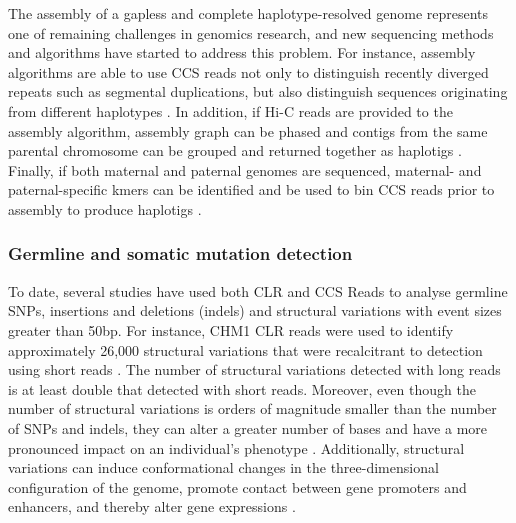 The assembly of a gapless and complete haplotype-resolved genome represents one of remaining challenges in genomics research, and new sequencing methods and algorithms have started to address this problem. For instance, assembly algorithms are able to use CCS reads not only to distinguish recently diverged repeats such as segmental duplications, but also distinguish sequences originating from different haplotypes \cite{}. In addition, if Hi-C reads are provided to the assembly algorithm, assembly graph can be phased and contigs from the same parental chromosome can be grouped and returned together as haplotigs \cite{}. Finally, if both maternal and paternal genomes are sequenced, maternal- and paternal-specific kmers can be identified and be used to bin CCS reads prior to assembly to produce haplotigs \cite{}. 

\subsubsection{Germline and somatic mutation detection}

To date, several studies have used both CLR and CCS Reads to analyse germline SNPs, insertions and deletions (indels) and structural variations with event sizes greater than 50bp. For instance, CHM1 CLR reads were used to identify approximately 26,000 structural variations that were recalcitrant to detection using short reads \cite{Chaisson2015-zz}. The number of structural variations detected with long reads is at least double that detected with short reads. Moreover, even though the number of structural variations is orders of magnitude smaller than the number of SNPs and indels, they can alter a greater number of bases and have a more pronounced impact on an individual's phenotype \cite{Weischenfeldt2013-tl}. Additionally, structural variations can induce conformational changes in the three-dimensional configuration of the genome, promote contact between gene promoters and enhancers, and thereby alter gene expressions \cite{Spielmann2018-fm}.

